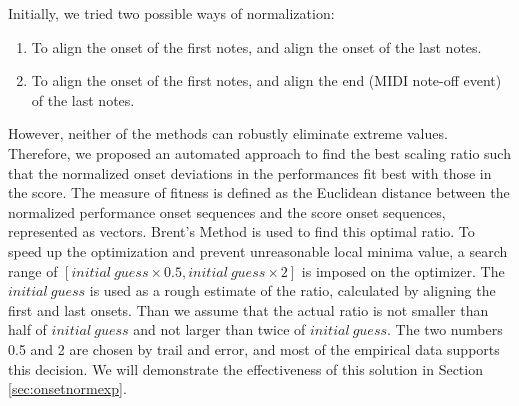 
   Initially, we tried two possible ways of normalization: 
   \begin{enumerate}
      \item To align the onset of the first notes, and align the onset of the last notes.
      \item To align the onset of the first notes, and align the end (MIDI note-off event) of the last notes.
   \end{enumerate}
   However, neither of the methods can robustly eliminate extreme values.  Therefore, we proposed an automated approach to find the best scaling ratio such that the normalized onset deviations in the performances fit best with those in the score. The measure of fitness is defined as the Euclidean distance between the normalized performance onset sequences and the score onset sequences, represented as vectors. %
 Brent's Method \cite{brent1973} is used to find this optimal ratio. To speed up the optimization and prevent unreasonable local minima value, a search range of $[initial\ guess \times 0.5 , initial\ guess \times 2]$ is imposed on the optimizer. The $initial\ guess$ is used as a rough estimate of the ratio, calculated by aligning the first and last onsets. Than we assume that the actual ratio is not smaller than half of $initial\ guess$ and not larger than twice of $initial\ guess$. The two numbers 0.5 and 2 are chosen by trail and error, and most of the empirical data supports this decision. We will demonstrate the effectiveness of this solution in Section \ref{sec:onsetnormexp}.

